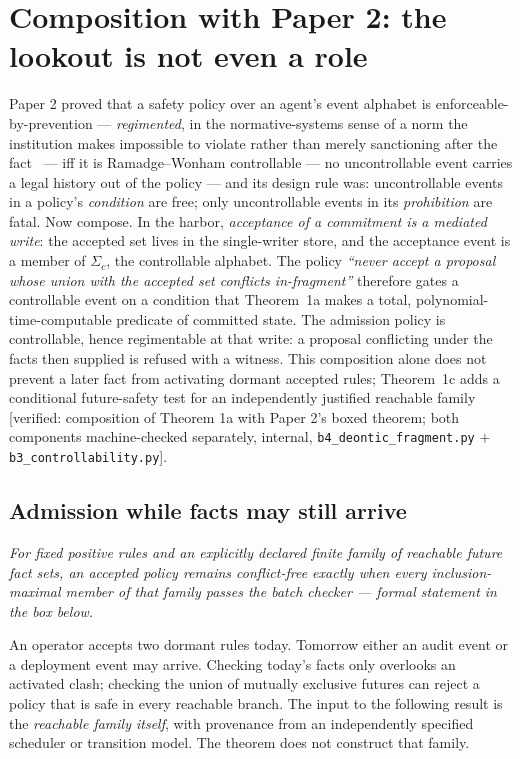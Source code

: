 \documentclass[11pt,a4paper]{article}
\newcommand{\onebreath}[1]{\begin{center}\emph{#1}\end{center}}
\begin{document}
\section{Composition with Paper 2: the lookout is not even a role}\label{sec:regiment}
Paper 2 proved that a safety policy over an agent's event alphabet is enforceable-by-prevention --- \emph{regimented}, in the
normative-systems sense of a norm the institution makes impossible to violate rather than merely sanctioning after the
fact~\cite{js93} --- iff it is Ramadge--Wonham controllable --- no uncontrollable event carries a legal history out of the policy --- and its design rule was:
uncontrollable events in a policy's \emph{condition} are free; only uncontrollable events in its \emph{prohibition} are fatal.
Now compose. In the harbor, \emph{acceptance of a commitment is a mediated write}: the accepted set lives in the single-writer
store, and the acceptance event is a member of $\Sigma_c$, the controllable alphabet. The policy \emph{``never accept a proposal
whose union with the accepted set conflicts in-fragment''} therefore gates a controllable event on a condition that Theorem~1a
makes a total, polynomial-time-computable predicate of committed state. The admission policy is controllable, hence regimentable at that write: a proposal conflicting under the facts then supplied
is refused with a witness. This composition alone does not prevent a later fact from activating dormant accepted rules;
Theorem~1c adds a conditional future-safety test for an independently justified reachable family
[verified: composition of Theorem 1a with Paper 2's boxed theorem; both components machine-checked separately, internal,
\texttt{b4\_deontic\_fragment.py} $+$ \texttt{b3\_controllability.py}].

\subsection*{Admission while facts may still arrive}\label{sec:reachable-admission}
\onebreath{For fixed positive rules and an explicitly declared finite family of reachable future fact sets, an accepted policy
remains conflict-free exactly when every inclusion-maximal member of that family passes the batch checker --- formal statement
in the box below.}
An operator accepts two dormant rules today. Tomorrow either an audit event or a deployment event may arrive. Checking today's
facts only overlooks an activated clash; checking the union of mutually exclusive futures can reject a policy that is safe in
every reachable branch. The input to the following result is the \emph{reachable family itself}, with provenance from an
independently specified scheduler or transition model. The theorem does not construct that family.
\end{document}
